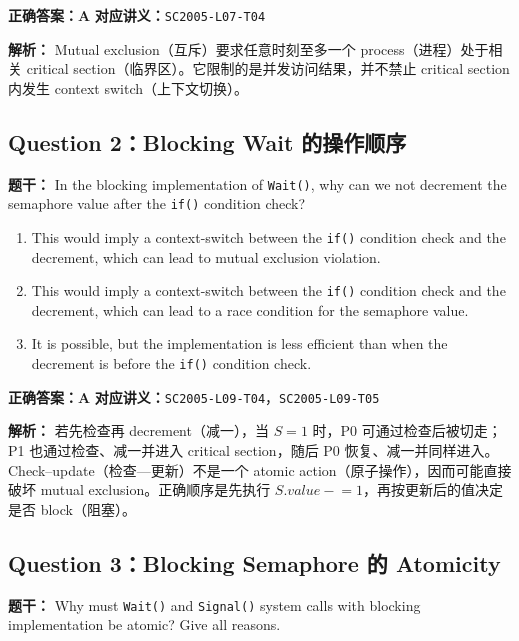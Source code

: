 \documentclass[11pt,a4paper,fontset=fandol]{ctexart}
\renewcommand{\exercisequestion}[2]{%
  \Needspace{5\baselineskip}%
  \subsection{#2}\label{exercise:#1}%
}
\renewenvironment{checkedsolution}
  {\par\nopagebreak[4]\textbf{解析：}\ignorespaces}
  {\par}
\begin{document}
\textbf{正确答案：A}\qquad
\textbf{对应讲义：}\texttt{SC2005-L07-T04}

\begin{checkedsolution}
Mutual exclusion（互斥）要求任意时刻至多一个 process（进程）处于相关 critical section（临界区）。它限制的是并发访问结果，并不禁止 critical section 内发生 context switch（上下文切换）。
\end{checkedsolution}

\exercisequestion{SC2005-HW03-Q02}{Question 2：Blocking Wait 的操作顺序}

\textbf{题干：} In the blocking implementation of \texttt{Wait()}, why can we not decrement the semaphore value after the \texttt{if()} condition check?

\begin{enumerate}[label=\Alph*.,leftmargin=2.4em]
  \item This would imply a context-switch between the \texttt{if()} condition check and the decrement, which can lead to mutual exclusion violation.
  \item This would imply a context-switch between the \texttt{if()} condition check and the decrement, which can lead to a race condition for the semaphore value.
  \item It is possible, but the implementation is less efficient than when the decrement is before the \texttt{if()} condition check.
\end{enumerate}

\textbf{正确答案：A}\qquad
\textbf{对应讲义：}\texttt{SC2005-L09-T04}，\texttt{SC2005-L09-T05}

\begin{checkedsolution}
若先检查再 decrement（减一），当 $S=1$ 时，P0 可通过检查后被切走；P1 也通过检查、减一并进入 critical section，随后 P0 恢复、减一并同样进入。Check--update（检查—更新）不是一个 atomic action（原子操作），因而可能直接破坏 mutual exclusion。正确顺序是先执行 $S.value\mathrel{-}=1$，再按更新后的值决定是否 block（阻塞）。
\end{checkedsolution}

\exercisequestion{SC2005-HW03-Q03}{Question 3：Blocking Semaphore 的 Atomicity}

\textbf{题干：} Why must \texttt{Wait()} and \texttt{Signal()} system calls with blocking implementation be atomic? Give all reasons.
\end{document}
